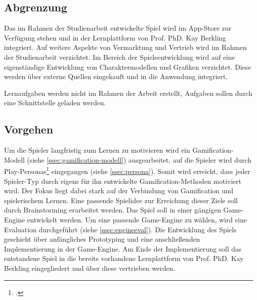\subsection{Abgrenzung}
	Das im Rahmen der Studienarbeit entwickelte Spiel wird im App-Store zur Verfügung stehen und in der Lernplattform von Prof. PhD. Kay Berkling integriert. Auf weitere Aspekte von Vermarktung und Vertrieb wird im Rahmen der Studienarbeit verzichtet.
	Im Bereich der Spieleentwicklung wird auf eine eigenständige Entwicklung von Charaktermodellen und Grafiken verzichtet. Diese werden über externe Quellen eingekauft und in die Anwendung integriert.

	Lernaufgaben werden nicht im Rahmen der Arbeit erstellt, Aufgaben sollen durch eine Schnittstelle geladen werden.

\subsection{Vorgehen}
	Um die Spieler langfristig zum Lernen zu motivieren wird ein Gamification-Modell (siehe \ref{ssec:gamification-modell}) ausgearbeitet, auf die Spieler wird durch Play-Personas\footcite{persona} eingegangen (siehe \ref{ssec:persona}). Somit wird erreicht, dass jeder Spieler-Typ durch eigens für ihn entwickelte Gamification-Methoden motiviert wird. Der Fokus liegt dabei stark auf der Verbindung von Gamification und spielerischem Lernen.
	Eine passende Spielidee zur Erreichung dieser Ziele soll durch Brainstorming erarbeitet werden.
	Das Spiel soll in einer gängigen Game-Engine entwickelt werden. Um eine passende Game-Engine zu wählen, wird eine Evaluation durchgeführt (siehe \ref{ssec:engineeval}).
	Die Entwicklung des Spiels geschieht über anfängliches Prototyping und eine anschließenden Implementierung in der Game-Engine. Am Ende der Implementierung soll das entstandene Spiel in die bereits vorhandene Lernplattform von Prof. PhD. Kay Berkling eingegliedert und über diese vertrieben werden.
